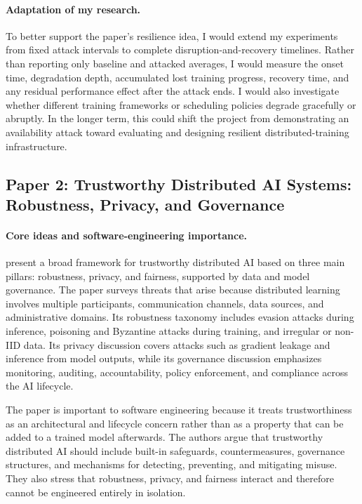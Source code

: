 \documentclass{article}
\begin{document}
\paragraph{Adaptation of my research.}

To better support the paper's resilience idea, I would extend my experiments
from fixed attack intervals to complete disruption-and-recovery timelines.
Rather than reporting only baseline and attacked averages, I would measure the
onset time, degradation depth, accumulated lost training progress, recovery
time, and any residual performance effect after the attack ends. I would also
investigate whether different training frameworks or scheduling policies
degrade gracefully or abruptly. In the longer term, this could shift the
project from demonstrating an availability attack toward evaluating and
designing resilient distributed-training infrastructure.


\subsection{Paper 2: Trustworthy Distributed AI Systems: Robustness,
Privacy, and Governance}
\paragraph{Core ideas and software-engineering importance.}

\cite{wenqi2025} present a broad framework for trustworthy distributed AI based on
three main pillars: robustness, privacy, and fairness, supported by data and
model governance. The paper surveys threats that arise because distributed
learning involves multiple participants, communication channels, data sources,
and administrative domains. Its robustness taxonomy includes evasion attacks
during inference, poisoning and Byzantine attacks during training, and
irregular or non-IID data. Its privacy discussion covers attacks such as
gradient leakage and inference from model outputs, while its governance
discussion emphasizes monitoring, auditing, accountability, policy
enforcement, and compliance across the AI lifecycle.

The paper is important to software engineering because it treats
trustworthiness as an architectural and lifecycle concern rather than as a
property that can be added to a trained model afterwards. The authors argue
that trustworthy distributed AI should include built-in safeguards,
countermeasures, governance structures, and mechanisms for detecting,
preventing, and mitigating misuse. They also stress that robustness, privacy,
and fairness interact and therefore cannot be engineered entirely in
isolation.
\end{document}
